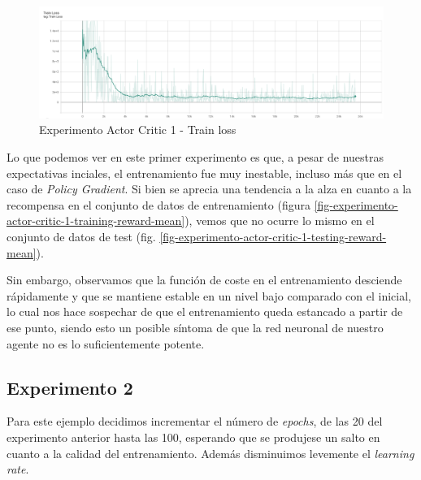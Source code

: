 \begin{figure}[H]
	\centering
	\includegraphics[width=1\textwidth]{figuras/experiments/actor_critic/actor_critic_20_epochs/train_loss.png}
	\caption[Experimento Actor Critic 1 - Train loss]{Experimento Actor Critic 1 - Train loss}
	\label{fig-experimento-actor-critic-1-train-loss}
\end{figure}
\medskip

Lo que podemos ver en este primer experimento es que, a pesar de nuestras expectativas inciales, el entrenamiento fue muy inestable, incluso más que en el caso de \textit{Policy Gradient}. Si bien se aprecia una tendencia a la alza en cuanto a la recompensa en el conjunto de datos de entrenamiento (figura \ref{fig-experimento-actor-critic-1-training-reward-mean}), vemos que no ocurre lo mismo en el conjunto de datos de test (fig. \ref{fig-experimento-actor-critic-1-testing-reward-mean}).
\medskip

Sin embargo, observamos que la función de coste en el entrenamiento desciende rápidamente y que se mantiene estable en un nivel bajo comparado con el inicial, lo cual nos hace sospechar de que el entrenamiento queda estancado a partir de ese punto, siendo esto un posible síntoma de que la red neuronal de nuestro agente no es lo suficientemente potente.
\medskip

\subsection{Experimento 2}
\label{resultados-actor-critic-experimento-2}

Para este ejemplo decidimos incrementar el número de \textit{epochs}, de las 20 del experimento anterior hasta las 100, esperando que se produjese un salto en cuanto a la calidad del entrenamiento. Además disminuimos levemente el \textit{learning rate}.

